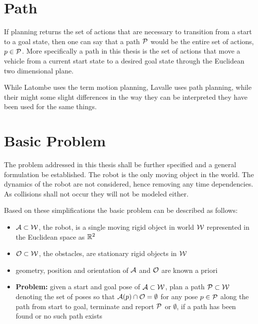 \section{Path}
If planning returns the set of actions that are necessary to transition from a start to a goal state, then one can say that a path $\mathcal{P}$ would be the entire set of actions, $p \in \mathcal{P}$. More specifically a path in this thesis is the set of actions that move a vehicle from a current start state to a desired goal state through the Euclidean two dimensional plane.

While Latombe uses the term motion planning, Lavalle uses path planning, while their might some slight differences in the way they can be interpreted they have been used for the same things. %

\section{Basic Problem}
The problem addressed in this thesis shall be further specified and a general formulation be established. The robot is the only moving object in the world. The dynamics of the robot are not considered, hence removing any time dependencies. As collisions shall not occur they will not be modeled either.

Based on these simplifications the basic problem can be described as follows:
\begin{itemize}
\item $\mathcal{A} \subset \mathcal{W}$, the robot, is a single moving rigid object in world $\mathcal{W}$ represented in the Euclidean space as $\mathbb{R}^2$
\item $\mathcal{O} \subset \mathcal{W}$, the obstacles, are stationary rigid objects in $\mathcal{W}$
\item geometry, position and orientation of $\mathcal{A}$ and $\mathcal{O}$ are known a priori
\item \textbf{Problem:} given a start and goal pose of $\mathcal{A} \subset \mathcal{W}$, plan a path $\mathcal{P} \subset \mathcal{W}$ denoting the set of poses so that $\mathcal{A}(p) \cap \mathcal{O} = \emptyset$ for any pose  $p \in \mathcal{P}$ along the path from start to goal, terminate and report $\mathcal{P}$ or $\emptyset$, if a path has been found or no such path exists
\end{itemize}

\cite{Latombe.1991,LaValle.2006}

